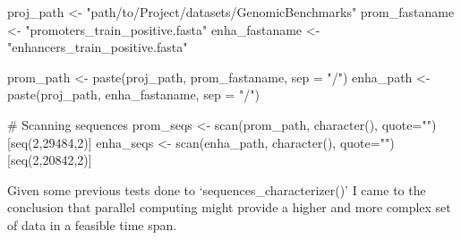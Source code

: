 \documentclass[
  letterpaper,
]{article}
\newenvironment{Shaded}{\begin{snugshade}}{\end{snugshade}}
\newcommand{\AttributeTok}[1]{\textcolor[rgb]{0.40,0.45,0.13}{#1}}
\newcommand{\CommentTok}[1]{\textcolor[rgb]{0.37,0.37,0.37}{#1}}
\newcommand{\DecValTok}[1]{\textcolor[rgb]{0.68,0.00,0.00}{#1}}
\newcommand{\FunctionTok}[1]{\textcolor[rgb]{0.28,0.35,0.67}{#1}}
\newcommand{\NormalTok}[1]{\textcolor[rgb]{0.00,0.23,0.31}{#1}}
\newcommand{\OtherTok}[1]{\textcolor[rgb]{0.00,0.23,0.31}{#1}}
\newcommand{\StringTok}[1]{\textcolor[rgb]{0.13,0.47,0.30}{#1}}
\begin{document}
\begin{Shaded}
\begin{Highlighting}[]
\NormalTok{proj\_path }\OtherTok{\textless{}{-}} \StringTok{"path/to/Project/datasets/GenomicBenchmarks"}
\NormalTok{prom\_fastaname }\OtherTok{\textless{}{-}} \StringTok{"promoters\_train\_positive.fasta"}
\NormalTok{enha\_fastaname }\OtherTok{\textless{}{-}} \StringTok{"enhancers\_train\_positive.fasta"}

\NormalTok{prom\_path }\OtherTok{\textless{}{-}} \FunctionTok{paste}\NormalTok{(proj\_path, prom\_fastaname, }\AttributeTok{sep =} \StringTok{"/"}\NormalTok{)}
\NormalTok{enha\_path }\OtherTok{\textless{}{-}} \FunctionTok{paste}\NormalTok{(proj\_path, enha\_fastaname, }\AttributeTok{sep =} \StringTok{"/"}\NormalTok{)}

\CommentTok{\# Scanning sequences}
\NormalTok{prom\_seqs }\OtherTok{\textless{}{-}} \FunctionTok{scan}\NormalTok{(prom\_path, }
                  \FunctionTok{character}\NormalTok{(), }\AttributeTok{quote=}\StringTok{""}\NormalTok{)[}\FunctionTok{seq}\NormalTok{(}\DecValTok{2}\NormalTok{,}\DecValTok{29484}\NormalTok{,}\DecValTok{2}\NormalTok{)]}
\NormalTok{enha\_seqs }\OtherTok{\textless{}{-}} \FunctionTok{scan}\NormalTok{(enha\_path, }
                  \FunctionTok{character}\NormalTok{(), }\AttributeTok{quote=}\StringTok{""}\NormalTok{)[}\FunctionTok{seq}\NormalTok{(}\DecValTok{2}\NormalTok{,}\DecValTok{20842}\NormalTok{,}\DecValTok{2}\NormalTok{)]}
\end{Highlighting}
\end{Shaded}

Given some previous tests done to `sequences\_characterizer()' I came to
the conclusion that parallel computing might provide a higher and more
complex set of data in a feasible time span.

\vspace{0.5cm}
\end{document}
